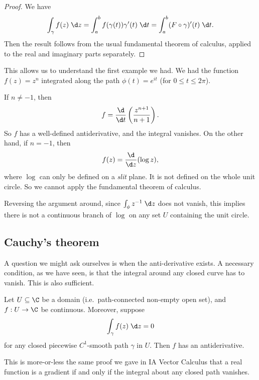\documentclass[a4paper]{article}
\begin{document}
\begin{proof}
  We have
  \[
    \int_\gamma f(z)\;\d z = \int_a^b f(\gamma(t)) \gamma'(t) \;\d t = \int_a^b (F \circ \gamma)' (t)\;\d t.
  \]
  Then the result follows from the usual fundamental theorem of calculus, applied to the real and imaginary parts separately.
\end{proof}

\begin{eg}
  This allows us to understand the first example we had. We had the function $f(z) = z^n$ integrated along the path $\phi(t) = e^{it}$ (for $0 \leq t \leq 2\pi$).

  If $n \not= -1$, then
  \[
    f = \frac{\d}{\d t}\left(\frac{z^{n + 1}}{n + 1}\right).
  \]
  So $f$ has a well-defined antiderivative, and the integral vanishes. On the other hand, if $n = -1$, then
  \[
    f(z) = \frac{\d}{\d z} (\log z),
  \]
  where $\log$ can only be defined on a \emph{slit} plane. It is not defined on the whole unit circle. So we cannot apply the fundamental theorem of calculus.

  Reversing the argument around, since $\int_\phi z^{-1} \;\d z$ does not vanish, this implies there is not a continuous branch of $\log$ on any set $U$ containing the unit circle.
\end{eg}

\subsection{Cauchy's theorem}
A question we might ask ourselves is when the anti-derivative exists. A necessary condition, as we have seen, is that the integral around any closed curve has to vanish. This is also sufficient.
\begin{prop}
  Let $U \subseteq \C$ be a domain (i.e.\ path-connected non-empty open set), and $f: U \to \C$ be continuous. Moreover, suppose
  \[
    \int_\gamma f(z)\;\d z = 0
  \]
  for any closed piecewise $C^1$-smooth path $\gamma$ in $U$. Then $f$ has an antiderivative.
\end{prop}

This is more-or-less the same proof we gave in IA Vector Calculus that a real function is a gradient if and only if the integral about any closed path vanishes.
\end{document}

